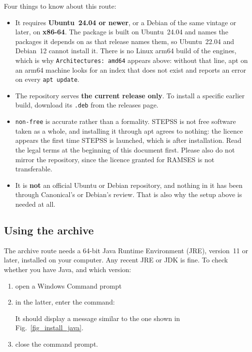 Four things to know about this route:
\begin{itemize}
\item It requires {\bf Ubuntu~24.04 or newer}, or a Debian of the same vintage or later, on {\bf x86-64}. The package is built on Ubuntu~24.04 and names the packages it depends on as that release names them, so Ubuntu~22.04 and Debian~12 cannot install it. There is no Linux arm64 build of the engines, which is why {\tt Architectures: amd64} appears above: without that line, apt on an arm64 machine looks for an index that does not exist and reports an error on every {\tt apt update}.
\item The repository serves {\bf the current release only}. To install a specific earlier build, download its {\tt .deb} from the releases page.
\item {\tt non-free} is accurate rather than a formality. STEPSS is not free software taken as a whole, and installing it through apt agrees to nothing: the licence appears the first time STEPSS is launched, which is after installation. Read the legal terms at the beginning of this document first. Please also do not mirror the repository, since the licence granted for RAMSES is not transferable.
\item It is {\bf not} an official Ubuntu or Debian repository, and nothing in it has been through Canonical's or Debian's review. That is also why the setup above is needed at all.
\end{itemize}

\subsection{Using the archive}

The archive route needs a 64-bit Java Runtime Environment (JRE), version~11 or later, installed on your computer. Any recent JRE or JDK is fine. To check whether you have Java, and which version:
\begin{enumerate}
\item open a Windows Command prompt
\item in the latter, enter the command:\\
\hspace*{5ex}{\tt java -version}

It should display a message similar to the one shown in Fig.~\ref{fig_install_java}.
\item close the command prompt.
\end{enumerate}

